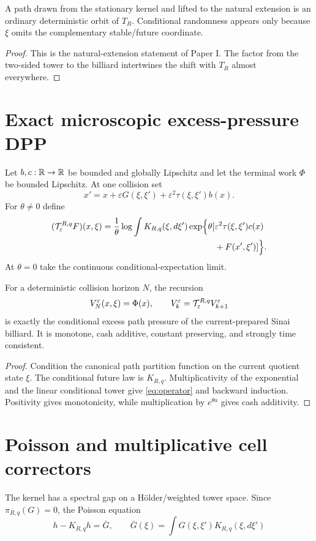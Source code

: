 \begin{proposition}\label{prop:deterministic}
A path drawn from the stationary kernel and lifted to the natural extension is
an ordinary deterministic orbit of $T_R$.  Conditional randomness appears
only because $\xi$ omits the complementary stable/future coordinate.
\end{proposition}
\begin{proof}
This is the natural-extension statement of Paper I.  The factor from the
two-sided tower to the billiard intertwines the shift with $T_R$ almost
everywhere.
\end{proof}

\section{Exact microscopic excess-pressure DPP}\label{sec:dpp}
Let $b,c:\mathbb R\to\mathbb R$ be bounded and globally Lipschitz and let the terminal work
$\Phi$ be bounded Lipschitz.  At one collision set
\[
 x'=x+\varepsilon G(\xi,\xi')
 +\varepsilon^2\tau(\xi,\xi')b(x).
\]
For $\theta\ne0$ define
\begin{equation}\label{eq:operator}
\begin{aligned}
 (\mathcal T_\varepsilon^{R,q}F)(x,\xi)
 =\frac1\theta\log\int K_{R,q}(\xi,d\xi')
 \exp\Bigl\{\theta[&\varepsilon^2\tau(\xi,\xi')c(x)\\
 &+F(x',\xi')]\Bigr\}.
\end{aligned}
\end{equation}
At $\theta=0$ take the continuous conditional-expectation limit.

\begin{theorem}\label{thm:exact-dpp}
For a deterministic collision horizon $N$, the recursion
\[
 V_N^\varepsilon(x,\xi)=\Phi(x),
 \qquad
 V_k^\varepsilon=\mathcal T_\varepsilon^{R,q}V_{k+1}^\varepsilon
\]
is exactly the conditional excess path pressure of the current-prepared Sinai
billiard.  It is monotone, cash additive, constant preserving, and strongly
time consistent.
\end{theorem}
\begin{proof}
Condition the canonical path partition function on the current quotient state
$\xi$.  The conditional future law is $K_{R,q}$.  Multiplicativity of the
exponential and the linear conditional tower give \eqref{eq:operator} and
backward induction.  Positivity gives monotonicity, while multiplication by
$e^{\theta a}$ gives cash additivity.
\end{proof}

\section{Poisson and multiplicative cell correctors}\label{sec:corrector}
The kernel has a spectral gap on a H\"older/weighted tower space.  Since
$\pi_{R,q}(G)=0$, the Poisson equation
\[
 h-K_{R,q}h=\bar G,
 \qquad
 \bar G(\xi)=\int G(\xi,\xi')K_{R,q}(\xi,d\xi')
\]